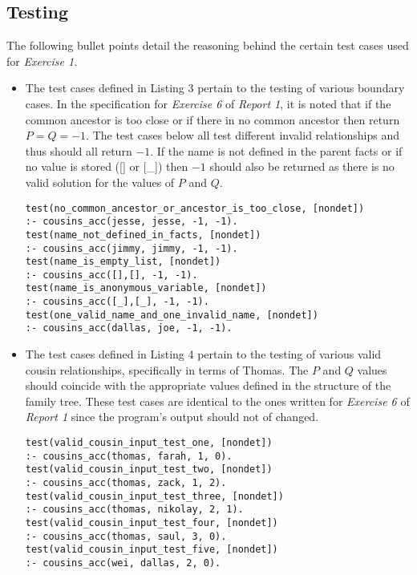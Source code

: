 \documentclass[11pt]{article}
\newcommand{\forceindent}{\leavevmode{\parindent=1em\indent}}
\begin{document}
	\subsection{Testing}
\forceindent The following bullet points detail the reasoning behind the certain test cases used for \emph{Exercise 1}.
\begin{itemize}
\item 
The test cases defined in Listing 3 pertain to the testing of various boundary cases. In the specification for \emph{Exercise 6} of \emph{Report 1}, it is noted that if the common ancestor is too close or if there in no common ancestor then return $P=Q=-1$. The test cases below all test different invalid relationships and thus should all return $-1$. If the name is not defined in the parent facts or if no value is stored ([] or [\_]) then $-1$ should also be returned as there is no valid solution for the values of $P$ and $Q$. 
\begin{lstlisting}[caption= Boundary Cases, label= Listing 3]
test(no_common_ancestor_or_ancestor_is_too_close, [nondet]) 
:- cousins_acc(jesse, jesse, -1, -1).
test(name_not_defined_in_facts, [nondet]) 
:- cousins_acc(jimmy, jimmy, -1, -1).
test(name_is_empty_list, [nondet]) 
:- cousins_acc([],[], -1, -1).
test(name_is_anonymous_variable, [nondet]) 
:- cousins_acc([_],[_], -1, -1).
test(one_valid_name_and_one_invalid_name, [nondet]) 
:- cousins_acc(dallas, joe, -1, -1).	
\end{lstlisting}


\item 
The test cases defined in Listing 4 pertain to the testing of various valid cousin relationships, specifically in terms of Thomas. The $P$ and $Q$ values should coincide with
the appropriate values defined in the structure of the family tree. These test cases are identical to the ones written for \emph{Exercise 6} of \emph{Report 1} since the program's output should not of changed.
\begin{lstlisting}[caption= Valid Relationships, label= Listing 4]
test(valid_cousin_input_test_one, [nondet]) 
:- cousins_acc(thomas, farah, 1, 0).
test(valid_cousin_input_test_two, [nondet]) 
:- cousins_acc(thomas, zack, 1, 2).
test(valid_cousin_input_test_three, [nondet]) 
:- cousins_acc(thomas, nikolay, 2, 1).
test(valid_cousin_input_test_four, [nondet]) 
:- cousins_acc(thomas, saul, 3, 0).
test(valid_cousin_input_test_five, [nondet]) 
:- cousins_acc(wei, dallas, 2, 0).
\end{lstlisting}


\end{itemize}
\end{document}
